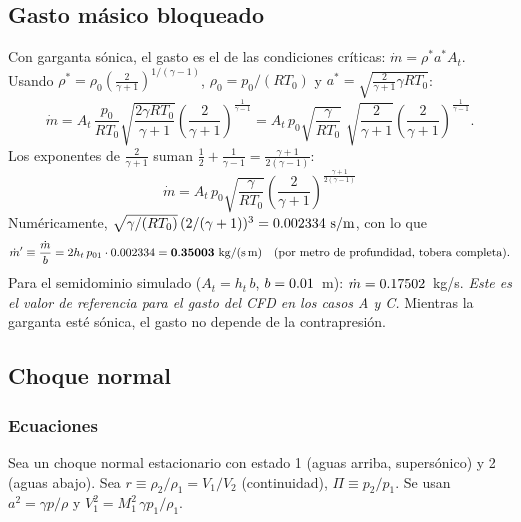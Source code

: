 \begin{table}[H]\centering\small
\caption{Newton--Raphson, rama supersónica ($A/\As=\ARr$, $M_0=2$).}\label{m:tab:nsup}
\end{table}
\begin{table}[H]\centering\small
\caption{Newton--Raphson, rama subsónica ($A/\As=\ARr$, $M_0=0.4$).}\label{m:tab:nsub}
\end{table}

\subsection{Gasto másico bloqueado}
Con garganta sónica, el gasto es el de las condiciones críticas: $\dot m=\rho^*a^*A_t$. Usando
$\rho^*=\rho_0\left(\tfrac{2}{\gamma+1}\right)^{1/(\gamma-1)}$, $\rho_0=p_0/(RT_0)$ y
$a^*=\sqrt{\tfrac{2}{\gamma+1}\gamma RT_0}$:
\[
\dot m=A_t\,\frac{p_0}{RT_0}\sqrt{\frac{2\gamma RT_0}{\gamma+1}}\left(\frac{2}{\gamma+1}\right)^{\frac{1}{\gamma-1}}
=A_t\,p_0\sqrt{\frac{\gamma}{RT_0}}\;\sqrt{\frac{2}{\gamma+1}}\left(\frac{2}{\gamma+1}\right)^{\frac{1}{\gamma-1}}.
\]
Los exponentes de $\tfrac{2}{\gamma+1}$ suman $\tfrac12+\tfrac1{\gamma-1}=\tfrac{\gamma+1}{2(\gamma-1)}$:
\begin{equation}
\boxed{\dot m=A_t\,p_0\sqrt{\frac{\gamma}{RT_0}}\left(\frac{2}{\gamma+1}\right)^{\frac{\gamma+1}{2(\gamma-1)}}}\label{m:eq:mdot}
\end{equation}
Numéricamente, $\sqrt{\gamma/(RT_0)}\,(2/(\gamma+1))^{3}=\coefm\ \mathrm{s/m}$, con lo que
\[
\dot m'\equiv\frac{\dot m}{b}=2h_t\,p_{01}\cdot\coefm=\mathbf{\mdotfull}\ \mathrm{kg/(s\,m)}
\quad\text{(por metro de profundidad, tobera completa).}
\]
Para el semidominio simulado ($A_t=h_t\,b$, $b=0.01$~m): $\dot m=0.17502$~kg/s. \emph{Este es el valor de
referencia para el gasto del CFD en los casos A y C.} Mientras la garganta esté sónica, el gasto no depende de la contrapresión.

\subsection{Choque normal}
\subsubsection{Ecuaciones}
Sea un choque normal estacionario con estado 1 (aguas arriba, supersónico) y 2 (aguas abajo). Sea $r\equiv\rho_2/\rho_1=V_1/V_2$ (continuidad),
$\Pi\equiv p_2/p_1$. Se usan $a^2=\gamma p/\rho$ y $V_1^2=M_1^2\,\gamma p_1/\rho_1$.


